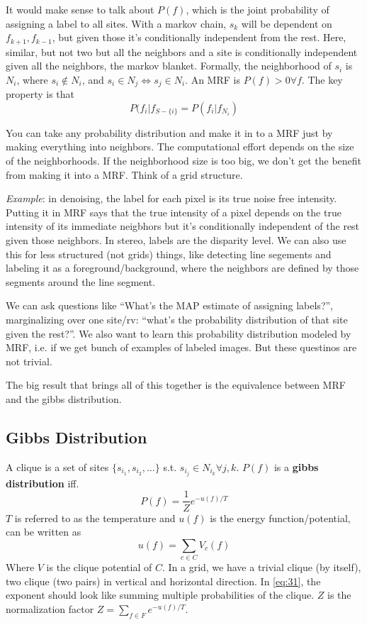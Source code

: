 It would make sense to talk about $P(f)$, which is the joint
probability of assigning a label to all sites. 
With a markov chain, $s_k$ will be dependent on $f_{k+1}, f_{k-1}$,
but given those it's conditionally independent from the rest. Here,
similar, but not two but all the neighbors and a site is conditionally
independent given all the neighbors, the markov blanket.
Formally, the neighborhood of $s_i$ is $N_i$, where $s_i\notin N_i$, and $s_i \in
N_j \iff s_j \in N_i$.
An MRF is $P(f) > 0 \forall f$. The key property is that 
\begin{equation}
  \label{eq:30}
P(f_i |f_{S-\{i\}} = P(f_i | f_{N_i})  
\end{equation}

You can take any probability distribution and make it in to a MRF just
by making everything into neighbors. The computational effort depends
on the size of the neighborhoods. If the neighborhood size is too big,
we don't get the benefit from making it into a MRF. Think of a grid
structure. 

\emph{Example}: in denoising, the label for each pixel is its true
noise free intensity. Putting it in MRF says that the true intensity of a pixel depends on the
true intensity of its immediate neigbhors but it's conditionally
independent of the rest given those neighbors.
In stereo, labels are the disparity level. 
We can also use this for less structured (not grids) things, like
detecting line segements and labeling it as a
foreground/background, where the neighbors are defined by those
segments around the line segment.

We can ask questions like ``What's the MAP estimate of assigning
labels?'', marginalizing over one site/rv: ``what's the probability distribution of
that site given the rest?''. We also want to learn this probability
distribution modeled by MRF, i.e. if we get bunch of examples of
labeled images. But these questinos are not trivial.

The big result that brings all of this together is the equivalence between MRF and
the gibbs distribution. 

\subsection{Gibbs Distribution}
\label{sec:gibbs-distribution}
A clique is a set of sites $\{s_{i_1}, s_{i_2}, \dots \}$
s.t. $s_{i_j} \in N_{i_k} \forall j,k$. $P(f)$ is a \textbf{gibbs
  distribution } iff.
\begin{equation}
  \label{eq:31}
  P(f) = \frac{1}{Z}e^{-u(f) / T}
\end{equation}
$T$ is referred to as the temperature and $u(f)$ is the energy
function/potential, can be written as
\begin{equation}
  \label{eq:32}
  u(f) = \sum_{c\in C} V_c(f)
\end{equation}
Where $V$ is the clique potential of $C$. In a grid, we have a trivial clique (by itself), two clique (two
pairs) in vertical and horizontal direction. In \eqref{eq:31}, the
exponent should look like summing multiple probabilities of the
clique. $Z$ is the normalization factor $Z= \sum_{f\in F} e^{-u(f)/T}$.

